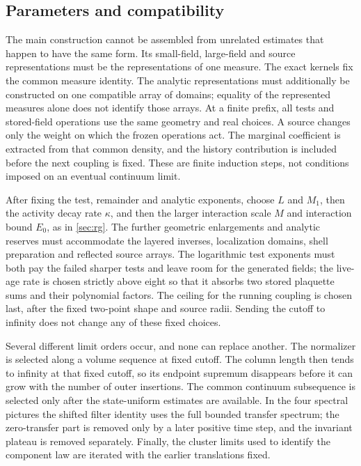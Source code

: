 \documentclass[11pt,letterpaper,reqno]{amsart}
\theoremstyle{definition}
\theoremstyle{remark}
\begin{document}
\subsection{Parameters and compatibility}\label{sec:remaining-tasks}

The main construction cannot be assembled from unrelated estimates
that happen to have the same form. Its small-field, large-field and
source representations must be the representations of one measure.
The exact kernels fix the common measure identity. The analytic
representations must additionally be constructed on one compatible
array of domains; equality of the represented measures alone does not
identify those arrays.
At a finite prefix, all tests and stored-field operations use the same
geometry and real choices. A source changes only the weight on which
the frozen operations act. The marginal coefficient is extracted from
that common density, and the history contribution is included before
the next coupling is fixed. These are finite induction steps, not
conditions imposed on an eventual continuum limit.

After fixing the test, remainder and analytic exponents, choose $L$
and $M_1$, then the activity decay rate $\kappa$, and then the
larger interaction scale $M$ and interaction bound $E_0$, as in
\cref{sec:rg}. The further geometric enlargements and analytic
reserves must accommodate the layered inverses, localization domains,
shell preparation and reflected source arrays. The logarithmic test
exponents must both pay the
failed sharper tests and leave room for the generated fields; the
live-age rate is chosen strictly above eight so that it absorbs two
stored plaquette sums and their polynomial factors. The ceiling for
the running coupling is chosen last, after the fixed two-point shape
and source radii. Sending the cutoff to infinity does not change any
of these fixed choices.

Several different limit orders occur, and none can replace another.
The normalizer is selected along a volume sequence at fixed cutoff.
The column length then tends to infinity at that fixed cutoff, so its
endpoint supremum disappears before it can grow with the number of
outer insertions. The common continuum subsequence is selected only
after the state-uniform estimates are available. In the four spectral
pictures the shifted filter identity uses the full bounded transfer
spectrum; the zero-transfer part is removed only by a later positive
time step, and the invariant plateau is removed separately. Finally,
the cluster limits used to identify the component law are iterated
with the earlier translations fixed.
\end{document}

